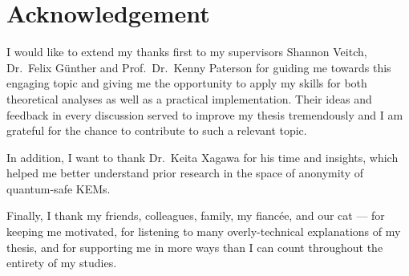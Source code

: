 \begin{abstract}
The Tor network enables anonymous communication by routing traffic through volunteer-operated relays, but access to the network is often restricted through censorship that targets identifiable protocol patterns.
In order to counteract such restrictions, protocols must resist fingerprinting, for example, by obfuscating their traffic to appear like random bytes on the wire.

One protocol targeting exactly this property is the \obfsfour{}~\cite{obfs4} protocol.
In this thesis, we build on the Tor Project's lyrebird repository implementing \obfsfour{}. Later, the \obfsfour{} protocol was extended by the obfuscated key exchange protocol \drivel{}~\cite{EPRINT:GRSV25} with post-quantum security and stronger obfuscation.
We implement \drivel{} and integrate it into the lyrebird repository. As \drivel{} requires ciphertexts to look random, we analyze the Classic-McEliece and HQC key encapsulation mechanisms, defining mappings from ciphertexts to random byte strings. These schemes are then integrated with our implementation, in addition to the previously examined ML-KEM and FrodoKEM schemes.
Finally, we empirically evaluate our implementation using benchmarks and local deployments and suggest concrete changes to \drivel{} to reduce identifiable traffic patterns in the handshake and increase performance.
\end{abstract}

\clearpage
\section*{Acknowledgement}
I would like to extend my thanks first to my supervisors Shannon Veitch, Dr.~Felix Günther and Prof.~Dr.~Kenny Paterson for guiding me towards this engaging topic and giving me the opportunity to apply my skills for both theoretical analyses as well as a practical implementation. Their ideas and feedback in every discussion served to improve my thesis tremendously and I am grateful for the chance to contribute to such a relevant topic.

In addition, I want to thank Dr.~Keita Xagawa for his time and insights, which helped me better understand prior research in the space of anonymity of quantum-safe KEMs.

Finally, I thank my friends, colleagues, family, my fiancée, and our cat --- for keeping me motivated, for listening to many overly-technical explanations of my thesis, and for supporting me in more ways than I can count throughout the entirety of my studies.